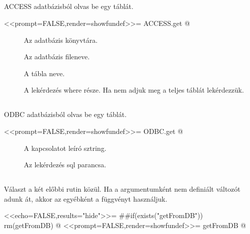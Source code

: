 \subsection{}
ACCESS adatbázisból olvas be egy táblát.
\begin{Rnw}
<<prompt=FALSE,render=showfundef>>=
ACCESS.get
@
\end{Rnw}
\begin{description}
\item[] Az adatbázis könyvtára.
\item[] Az adatbázis fileneve.
\item[] A tábla neve.
\item[] A lekérdezés where része. Ha nem adjuk meg a teljes táblát lekérdezzük.
\end{description}

\subsection{}
ODBC adatbázisból olvas be egy táblát.
\begin{Rnw}
<<prompt=FALSE,render=showfundef>>=
ODBC.get
@
\end{Rnw}
\begin{description}
\item[] A kapcsolatot leíró sztring.
\item[] Az lekérdezés sql parancsa.
\end{description}

\subsection{}

Választ a két előbbi rutin közül. Ha a  argumentumként nem
definiált változót adunk át, 
akkor az  egyébként a  függvényt használjuk.

\begin{Rnw}
<<echo=FALSE,results="hide">>=
##if(exists("getFromDB")) rm(getFromDB)
@
<<prompt=FALSE,render=showfundef>>=
getFromDB
@
\end{Rnw}



